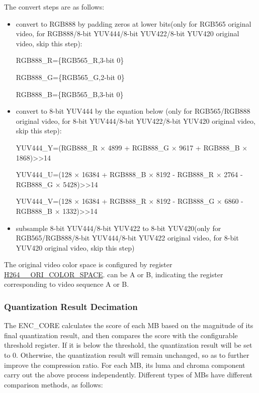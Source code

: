 \documentclass[main\_\_EN.tex]{subfiles}
\begin{document}
The convert steps are as follows:
\begin{itemize}
    \item convert to RGB888 by padding zeros at lower bits(only for RGB565 original video, for RGB888/8-bit YUV444/8-bit YUV422/8-bit YUV420 original video, skip this step):
    \begin{center}
        RGB888\_R=\{RGB565\_R,3-bit 0\}
    \end{center}
    \begin{center}
        RGB888\_G=\{RGB565\_G,2-bit 0\}
    \end{center}
    \begin{center}
        RGB888\_B=\{RGB565\_B,3-bit 0\}
    \end{center}
    \item convert to 8-bit YUV444 by the equation below (only for RGB565/RGB888 original video, for 8-bit YUV444/8-bit YUV422/8-bit YUV420 original video, skip this step):
    \begin{center}
        YUV444\_Y=(RGB888\_R × 4899 + RGB888\_G × 9617 + RGB888\_B × 1868)>>14
    \end{center}
    \begin{center}
        YUV444\_U=(128 × 16384 + RGB888\_B × 8192 - RGB888\_R × 2764 - RGB888\_G × 5428)>>14
    \end{center}
    \begin{center}
        YUV444\_V=(128 × 16384 + RGB888\_R × 8192 - RGB888\_G × 6860 - RGB888\_B × 1332)>>14
    \end{center}
    \item subsample 8-bit YUV444/8-bit YUV422 to 8-bit YUV420(only for RGB565/RGB888/8-bit YUV444/8-bit YUV422 original video, for 8-bit YUV420 original video, skip this step)
\end{itemize}

The original video color space is configured by register \hyperref[fielddesc:H264AORICOLORSPACE]{H264\_\_ORI\_COLOR\_SPACE}.  can be A or B, indicating the register corresponding to video sequence A or B.


\subsubsection{Quantization Result Decimation}\label{sec:h264-decimate}
The ENC\_CORE calculates the score of each MB based on the magnitude of its final quantization result, and then compares the score with the configurable threshold register. If it is below the threshold, the quantization result will be set to 0. Otherwise, the quantization result will remain unchanged, so as to further improve the compression ratio. For each MB, its luma and chroma component carry out the above process independently. Different types of MBs have different comparison methods, as follows:
\end{document}
